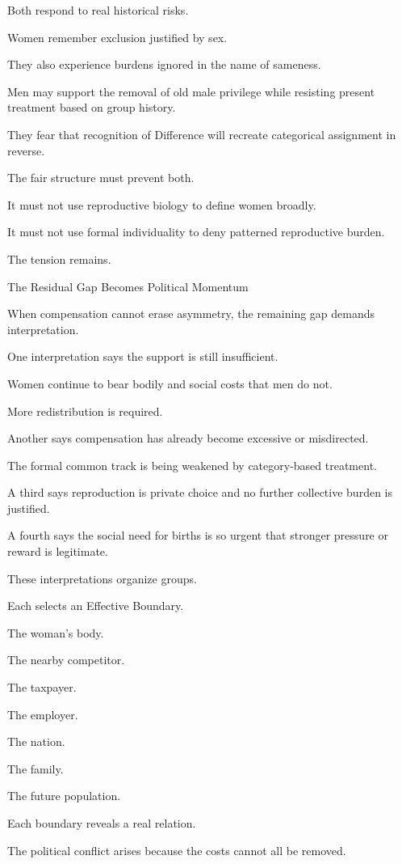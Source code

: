 Both respond to real historical risks.

Women remember exclusion justified by sex.

They also experience burdens ignored in the name of sameness.

Men may support the removal of old male privilege while resisting present treatment based on group history.

They fear that recognition of Difference will recreate categorical assignment in reverse.

The fair structure must prevent both.

It must not use reproductive biology to define women broadly.

It must not use formal individuality to deny patterned reproductive burden.

The tension remains.

The Residual Gap Becomes Political Momentum

When compensation cannot erase asymmetry, the remaining gap demands interpretation.

One interpretation says the support is still insufficient.

Women continue to bear bodily and social costs that men do not.

More redistribution is required.

Another says compensation has already become excessive or misdirected.

The formal common track is being weakened by category-based treatment.

A third says reproduction is private choice and no further collective burden is justified.

A fourth says the social need for births is so urgent that stronger pressure or reward is legitimate.

These interpretations organize groups.

Each selects an Effective Boundary.

The woman’s body.

The nearby competitor.

The taxpayer.

The employer.

The nation.

The family.

The future population.

Each boundary reveals a real relation.

The political conflict arises because the costs cannot all be removed.

